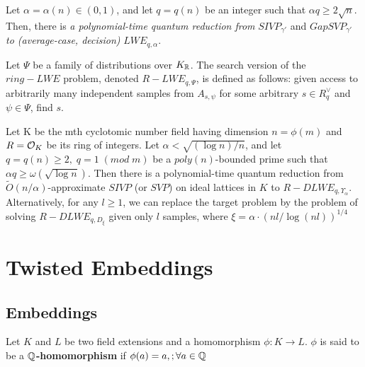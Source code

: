 \documentclass[Ingles]{ic-tese-v3}
\begin{document}
\begin{theorem}
  Let $\alpha = \alpha(n) \in (0, 1)$, and let $q = q(n)$ be an integer such that $\alpha q \geq 
  2\sqrt{n}$. Then, there is \emph{a polynomial-time quantum reduction from} $SIVP_{\gamma'}$
  and $GapSVP_{\gamma'}$ \emph{to (average-case, decision)} $LWE_{q,\alpha}$.
\end{theorem}

\begin{definition}
  \label{def:rlwe-search}
Let $\Psi$ be a family of distributions over $K_{\mathbb{R}}$. The search version of the $ring-LWE$ problem, denoted $R-LWE_{q,\Psi}$, is defined as follows: given access to arbitrarily many independent samples from $A_{s,\psi}$ for some arbitrary $s \in R_q^\vee$ and $\psi \in \Psi$, find $s$.
\end{definition}

\begin{theorem}
  Let K be the mth cyclotomic number field having dimension $n = \phi(m)$ and $R =
  \mathcal{O}_K$ be its ring of integers. Let $\alpha < \sqrt{(\log{n})/n}$, and let $q = q(n)
  \geq 2, \; q = 1 \; (mod \; m)$ be a $poly(n)$-bounded prime such that $\alpha q \geq
  \omega(\sqrt{\log{n}})$. Then there is a polynomial-time quantum reduction from
  $\tilde{O}(n/\alpha)$-approximate $SIVP$ (or $SVP$) on ideal lattices in $K$ to
  $R-DLWE_{q,\Upsilon_\alpha}$. Alternatively, for any $l \geq 1$, we can replace the target
  problem by the problem of solving $R-DLWE_{q,D_\xi}$ given only $l$ samples,
  where $\xi = \alpha \cdot ( nl/ \log{(nl)} )^{1/4}$
\end{theorem}

\section{Twisted Embeddings}
\label{sec:org502da68}
\subsection{Embeddings}
\label{sec:org15dfb25}

\begin{definition}
Let $K$ and $L$ be two field extensions and a homomorphism $\phi: K \rightarrow L$. $\phi$ is said to be a \textbf{$\mathbb{Q}$-homomorphism} if $\phi(a) = a, ; \forall a \in \mathbb{Q}$ 
\end{definition}
\end{document}
